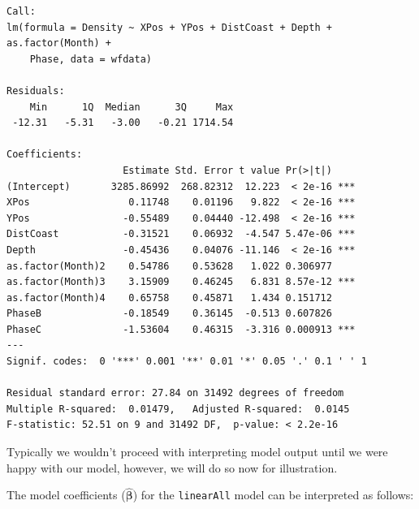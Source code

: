 \documentclass[
  oneside]{krantz}
\begin{document}
\begin{verbatim}
Call:
lm(formula = Density ~ XPos + YPos + DistCoast + Depth + as.factor(Month) + 
    Phase, data = wfdata)

Residuals:
    Min      1Q  Median      3Q     Max 
 -12.31   -5.31   -3.00   -0.21 1714.54 

Coefficients:
                    Estimate Std. Error t value Pr(>|t|)    
(Intercept)       3285.86992  268.82312  12.223  < 2e-16 ***
XPos                 0.11748    0.01196   9.822  < 2e-16 ***
YPos                -0.55489    0.04440 -12.498  < 2e-16 ***
DistCoast           -0.31521    0.06932  -4.547 5.47e-06 ***
Depth               -0.45436    0.04076 -11.146  < 2e-16 ***
as.factor(Month)2    0.54786    0.53628   1.022 0.306977    
as.factor(Month)3    3.15909    0.46245   6.831 8.57e-12 ***
as.factor(Month)4    0.65758    0.45871   1.434 0.151712    
PhaseB              -0.18549    0.36145  -0.513 0.607826    
PhaseC              -1.53604    0.46315  -3.316 0.000913 ***
---
Signif. codes:  0 '***' 0.001 '**' 0.01 '*' 0.05 '.' 0.1 ' ' 1

Residual standard error: 27.84 on 31492 degrees of freedom
Multiple R-squared:  0.01479,   Adjusted R-squared:  0.0145 
F-statistic: 52.51 on 9 and 31492 DF,  p-value: < 2.2e-16
\end{verbatim}

\normalsize

Typically we wouldn't proceed with interpreting model output until we were happy with our model, however, we will do so now for illustration.

The model coefficients (\(\hat{\boldsymbol{\beta}}\)) for the \texttt{linearAll} model can be interpreted as follows:
\end{document}
